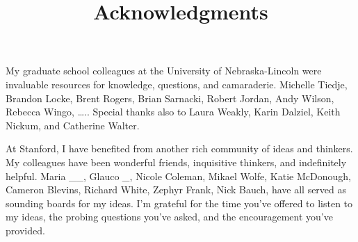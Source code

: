 \documentclass[11pt,article,oneside]{memoir}
\title{\bigskip \bigskip Acknowledgments}
\author{\bigskip\Large }
\begin{document}
  

\setsansfont[Mapping=tex-text, BoldFont={* Bold SemiCondensed}, ItalicFont={* Semibold SemiCondensed Italic}]{Myriad Pro}
\setmonofont[Mapping=tex-text,Scale=MatchLowercase]{Consolas}


\setsansfont[Mapping=tex-text]{Minion Pro} 
\setmonofont[Mapping=tex-text,Scale=0.8]{Consolas}
\pagestyle{kjh}


\maketitle


My graduate school colleagues at the University of Nebraska-Lincoln were
invaluable resources for knowledge, questions, and camaraderie. Michelle
Tiedje, Brandon Locke, Brent Rogers, Brian Sarnacki, Robert Jordan, Andy
Wilson, Rebecca Wingo, \ldots{}.. Special thanks also to Laura Weakly,
Karin Dalziel, Keith Nickum, and Catherine Walter.

At Stanford, I have benefited from another rich community of ideas and
thinkers. My colleagues have been wonderful friends, inquisitive
thinkers, and indefinitely helpful. Maria \_\_, Glauco \emph{\_}, Nicole
Coleman, Mikael Wolfe, Katie McDonough, Cameron Blevins, Richard White,
Zephyr Frank, Nick Bauch, have all served as sounding boards for my
ideas. I'm grateful for the time you've offered to listen to my ideas,
the probing questions you've asked, and the encouragement you've
provided.
\end{document}

